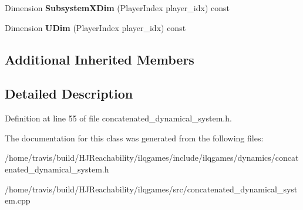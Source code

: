 \begin{DoxyCompactItemize}
\item 
Dimension {\bfseries Subsystem\+X\+Dim} (Player\+Index player\+\_\+idx) const \hypertarget{classilqgames_1_1_concatenated_dynamical_system_a8a41a816bf3320cd6d78548beac02d80}{}\label{classilqgames_1_1_concatenated_dynamical_system_a8a41a816bf3320cd6d78548beac02d80}

\item 
Dimension {\bfseries U\+Dim} (Player\+Index player\+\_\+idx) const \hypertarget{classilqgames_1_1_concatenated_dynamical_system_a99e27c1644875b924741e037bcb54460}{}\label{classilqgames_1_1_concatenated_dynamical_system_a99e27c1644875b924741e037bcb54460}

\end{DoxyCompactItemize}
\subsection*{Additional Inherited Members}


\subsection{Detailed Description}


Definition at line 55 of file concatenated\+\_\+dynamical\+\_\+system.\+h.



The documentation for this class was generated from the following files\+:\begin{DoxyCompactItemize}
\item 
/home/travis/build/\+H\+J\+Reachability/ilqgames/include/ilqgames/dynamics/concatenated\+\_\+dynamical\+\_\+system.\+h\item 
/home/travis/build/\+H\+J\+Reachability/ilqgames/src/concatenated\+\_\+dynamical\+\_\+system.\+cpp\end{DoxyCompactItemize}
